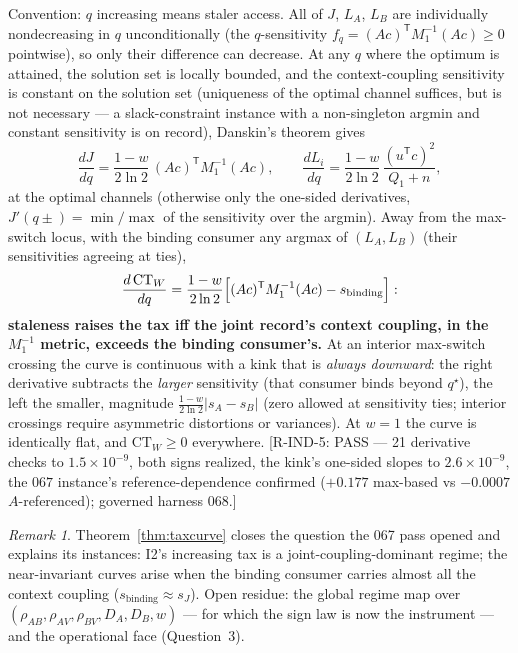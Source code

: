 ﻿\documentclass[11pt]{article}
\theoremstyle{remark}
\newtheorem{remark}{Remark}
\begin{document}
\begin{theorem}\label{thm:taxcurve}
Convention: $q$ increasing means staler access. All of $J$, $L_A$,
$L_B$ are individually nondecreasing in $q$ unconditionally (the
$q$-sensitivity $f_q=(Ac)^{\mathsf T}M_1^{-1}(Ac)\ge0$ pointwise), so
only their difference can decrease. At any $q$ where the optimum is
attained, the solution set is locally bounded, and the
context-coupling sensitivity is constant on the solution set
(uniqueness of the optimal channel suffices, but is not necessary ---
a slack-constraint instance with a non-singleton argmin and constant
sensitivity is on record), Danskin's theorem \cite{bib:danskin66} gives
\[
\frac{dJ}{dq}=\frac{1-w}{2\ln2}\,(Ac)^{\mathsf T}M_1^{-1}(Ac),\qquad
\frac{dL_i}{dq}=\frac{1-w}{2\ln2}\,\frac{(u^{\mathsf T}c)^2}{Q_1+n},
\]
at the optimal channels (otherwise only the one-sided derivatives,
$J'(q\pm)=\min/\max$ of the sensitivity over the argmin). Away from
the max-switch locus, with the binding consumer any argmax of
$(L_A,L_B)$ (their sensitivities agreeing at ties),
\[
\frac{d\,\mathrm{CT}_W}{dq}=\frac{1-w}{2\ln2}\Bigl[(Ac)^{\mathsf T}
M_1^{-1}(Ac)-s_{\mathrm{binding}}\Bigr]:
\]
\textbf{staleness raises the tax iff the joint record's context
coupling, in the $M_1^{-1}$ metric, exceeds the binding consumer's.}
At an interior max-switch crossing the curve is continuous with a
kink that is \emph{always downward}: the right derivative subtracts
the \emph{larger} sensitivity (that consumer binds beyond $q^\star$),
the left the smaller, magnitude $\tfrac{1-w}{2\ln2}|s_A-s_B|$ (zero
allowed at sensitivity ties; interior crossings require asymmetric
distortions or variances). At $w=1$ the curve is identically flat,
and $\mathrm{CT}_W\ge0$ everywhere. [R-IND-5: PASS --- 21 derivative
checks to $1.5\times10^{-9}$, both signs realized, the kink's
one-sided slopes to $2.6\times10^{-9}$, the $067$ instance's
reference-dependence confirmed ($+0.177$ max-based vs $-0.0007$
$A$-referenced); governed harness 068.]
\end{theorem}

\begin{remark}
Theorem~\ref{thm:taxcurve} closes the question the 067 pass opened
and explains its instances: I2's increasing tax is a
joint-coupling-dominant regime; the near-invariant curves arise when
the binding consumer carries almost all the context coupling
($s_{\mathrm{binding}}\approx s_J$). Open residue: the global regime
map over $(\rho_{AB},\rho_{AV},\rho_{BV},D_A,D_B,w)$ --- for which the
sign law is now the instrument --- and the operational face
(Question~3).
\end{remark}
\end{document}
